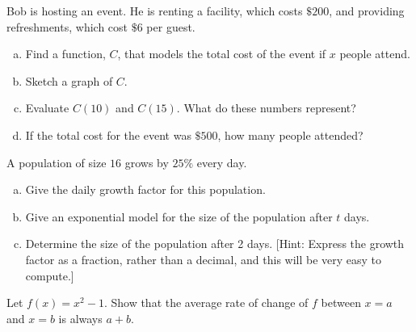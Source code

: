 \documentclass[12pt]{amsart}
\begin{document}
\begin{thm}[16 Points]\label{ex7}
  Bob is hosting an event.  He is renting a facility, which costs $\$200$, and providing refreshments, which cost $\$6$ per guest.
  \begin{enumerate}[(a)]
  \item
    Find a function, $C$, that models the total cost of the event if $x$ people attend.
    \vspace{1in}
  \item
    Sketch a graph of $C$.
    \vspace{2in}
  \item
    Evaluate $C(10)$ and $C(15)$.  What do these numbers represent?
    \vspace{1in}
  \item
    If the total cost for the event was $\$500$, how many people attended?
    \vspace{1in}
  \end{enumerate}
\end{thm}

\newpage

\begin{thm}[16 Points]
  A population of size $16$ grows by $25\%$ every day.
  \begin{enumerate}[(a)]
  \item
    Give the daily growth factor for this population.
    \vspace{1in}
  \item
    Give an exponential model for the size of the population after $t$ days.
    \vspace{1.5in}
  \item
    Determine the size of the population after 2 days.  [Hint: Express the growth factor as a fraction, rather than a decimal, and this will be very easy to compute.]
    \vspace{1.5in}
  \end{enumerate}
\end{thm}

\newpage

\begin{thm}\label{bonus}
  Let $f(x) = x^2 - 1$.
  Show that the average rate of change of $f$ between $x = a$ and $x = b$ is always $a + b$.
\end{thm}
\end{document}
